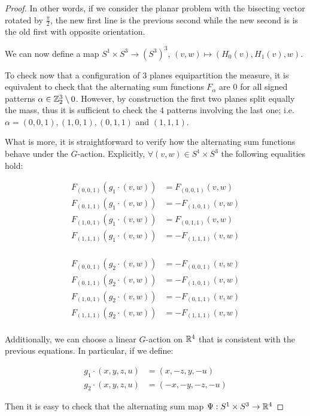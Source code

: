\documentclass[10pt]{article}
\begin{document}
\begin{proof}
	In other words, if we consider the planar problem with the bisecting vector rotated by $\frac{\pi}{2}$, the new first line is the previous second while the new second is
is the old first with opposite orientation.

We can now define a map $S^1\times S^3 \rightarrow (S^3)^3$, $(v, w) \mapsto (H_0(v), H_1(v), w)$.

To check now that a configuration of $3$ planes equipartition the measure, it is equivalent to check that the alternating sum functions $F_\alpha$ are $0$ for all signed
patterns $\alpha\in \mathbb{Z}_2^3 \setminus 0$. However, by construction the first two planes split equally the mass, thus it is sufficient to check the $4$
patterns involving the last one; i.e. $\alpha = (0,0,1), (1,0,1), (0,1,1)$ and $(1,1,1)$.

What is more, it is straightforward to verify how the alternating sum functions behave under the $G$-action.
Explicitly, $\forall (v,w)\in S^1\times S^3$ the following equalities hold:

\begin{align*}
	F_{(0,0,1)}(g_1\cdot (v,w)) &=  F_{(0,0,1)}(v,w)\\
	F_{(0,1,1)}(g_1\cdot (v,w)) &=   - F_{(1,0,1)}(v,w)\\
	F_{(1,0,1)}(g_1\cdot (v,w)) &=  F_{(0,1,1)}(v,w)\\
	F_{(1,1,1)}(g_1\cdot (v,w)) &=  - F_{(1,1,1)}(v,w)\\
\end{align*}

\begin{align*}
	F_{(0,0,1)}(g_2\cdot (v,w)) &=  - F_{(0,0,1)}(v,w)\\
	F_{(0,1,1)}(g_2\cdot (v,w)) &=  - F_{(1,0,1)}(v,w)\\
	F_{(1,0,1)}(g_2\cdot (v,w)) &=  - F_{(0,1,1)}(v,w)\\
	F_{(1,1,1)}(g_2\cdot (v,w)) &=  - F_{(1,1,1)}(v,w)\\
\end{align*}

Additionally, we can choose a linear $G$-action on $\mathbb{R}^4$ that is consistent with the previous equations. In particular, if we define:

\begin{align*}
	g_1\cdot (x, y, z, u) &= (x, -z, y, -u)\\
	g_2 \cdot (x, y, z, u) &= (-x, -y, -z, -u)
\end{align*}

Then it is easy to check that the alternating sum map $\Psi: S^1\times S^3 \rightarrow \mathbb{R}^4$


\end{proof}
\end{document}
